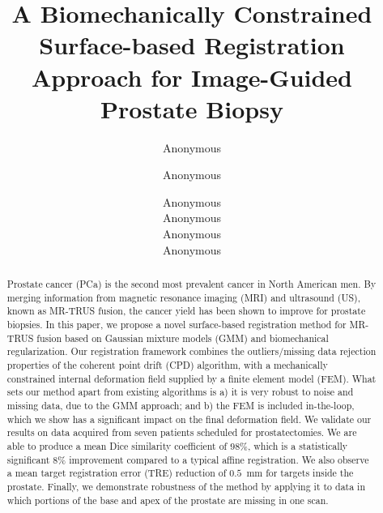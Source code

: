 \documentclass[runningheads,a4paper]{llncs}
\begin{document}
\pagestyle{empty}
\mainmatter
\title{A Biomechanically Constrained Surface-based Registration Approach for Image-Guided Prostate Biopsy}


%
%
\author{Anonymous \and Anonymous \and Anonymous \\ Anonymous \\ Anonymous \\ Anonymous}

\newcommand{\MODIFY}[1]{\textcolor{red}{#1}}

\maketitle

\begin{abstract}
Prostate cancer (PCa) is the second most prevalent cancer in North American men. By merging information from magnetic resonance imaging (MRI) and ultrasound (US), known as MR-TRUS fusion, the cancer yield has been shown to improve for prostate biopsies. In this paper, we propose a novel surface-based registration method for MR-TRUS fusion based on Gaussian mixture models (GMM) and biomechanical regularization. Our registration framework combines the outliers/missing data rejection properties of the coherent point drift (CPD) algorithm, with a mechanically constrained internal deformation field supplied by a finite element model (FEM).  What sets our method apart from existing algorithms is a) it is very robust to noise and missing data, due to the GMM approach; and b) the FEM is included in-the-loop, which we show has a significant impact on the final deformation field.  We validate our results on data acquired from seven patients scheduled for prostatectomies. We are able to produce a mean Dice similarity coefficient of $98\%$, which is a statistically significant $8\%$ improvement compared to a typical affine registration. We also observe a mean target registration error (TRE) reduction of $0.5$~mm for targets inside the prostate. Finally, we demonstrate robustness of the method by applying it to data in which portions of the base and apex of the prostate are missing in one scan.
\end{abstract}
\end{document}
